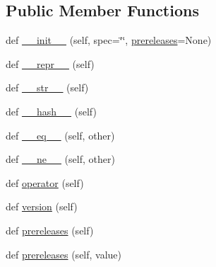 \subsection*{Public Member Functions}
\begin{DoxyCompactItemize}
\item 
def \hyperlink{classpkg__resources_1_1__vendor_1_1packaging_1_1specifiers_1_1__IndividualSpecifier_a8c802e924c48d03d87a2571beaa2e91e}{\+\_\+\+\_\+init\+\_\+\+\_\+} (self, spec=\char`\"{}\char`\"{}, \hyperlink{classpkg__resources_1_1__vendor_1_1packaging_1_1specifiers_1_1__IndividualSpecifier_a8cca74d9dafa725b0cb9160decd0aab6}{prereleases}=None)
\item 
def \hyperlink{classpkg__resources_1_1__vendor_1_1packaging_1_1specifiers_1_1__IndividualSpecifier_a8e54b412330c26a0f8e7ac40ba520ca0}{\+\_\+\+\_\+repr\+\_\+\+\_\+} (self)
\item 
def \hyperlink{classpkg__resources_1_1__vendor_1_1packaging_1_1specifiers_1_1__IndividualSpecifier_a0d90c70606c18b989c1d532c130baac5}{\+\_\+\+\_\+str\+\_\+\+\_\+} (self)
\item 
def \hyperlink{classpkg__resources_1_1__vendor_1_1packaging_1_1specifiers_1_1__IndividualSpecifier_abce2d4ecf1245766e7e997c0f1c98445}{\+\_\+\+\_\+hash\+\_\+\+\_\+} (self)
\item 
def \hyperlink{classpkg__resources_1_1__vendor_1_1packaging_1_1specifiers_1_1__IndividualSpecifier_aeb15b148f59373e347739c74e3b6fc0c}{\+\_\+\+\_\+eq\+\_\+\+\_\+} (self, other)
\item 
def \hyperlink{classpkg__resources_1_1__vendor_1_1packaging_1_1specifiers_1_1__IndividualSpecifier_a3dd2f556a74262faafcd6af1f876b6c1}{\+\_\+\+\_\+ne\+\_\+\+\_\+} (self, other)
\item 
def \hyperlink{classpkg__resources_1_1__vendor_1_1packaging_1_1specifiers_1_1__IndividualSpecifier_ae89e9a32423fadb7570151e96dbb9c03}{operator} (self)
\item 
def \hyperlink{classpkg__resources_1_1__vendor_1_1packaging_1_1specifiers_1_1__IndividualSpecifier_a98ff7bb31634856e5dda863aacbcb98b}{version} (self)
\item 
def \hyperlink{classpkg__resources_1_1__vendor_1_1packaging_1_1specifiers_1_1__IndividualSpecifier_a8cca74d9dafa725b0cb9160decd0aab6}{prereleases} (self)
\item 
def \hyperlink{classpkg__resources_1_1__vendor_1_1packaging_1_1specifiers_1_1__IndividualSpecifier_aa902b62447455891e44472aa4d40b9b2}{prereleases} (self, value)
\item 

\end{DoxyCompactItemize}
